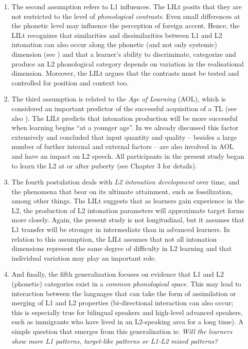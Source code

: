 \begin{enumerate}[label={(\arabic*)}]
\item
         The second assumption refers to L1 influences. The LILt posits that they are not restricted to the level of \textit{phonological contrasts}. Even small differences at the phonetic level may influence the perception of foreign accent. Hence, the LILt recognizes that similarities and dissimilarities between L1 and L2 intonation can also occur along the phonetic (and not only systemic) dimension (see ) and that a learner’s ability to discriminate, categorize and produce an L2 phonological category depends on variation in the realisational dimension. Moreover, the LILt argues that the contrasts must be tested and controlled for position and context too.\largerpage



\item
         The third assumption is related to the \textit{Age of Learning} (AOL), which is considered an important predictor of the successful acquisition of a TL (see also ). The LILt predicts that intonation production will be more successful when learning begins “at a younger age”. In  we already discussed this factor extensively and concluded that input quantity and quality -- besides a large number of further internal and external factors -- are also involved in AOL and have an impact on L2 speech. All participants in the present study began to learn the L2 at or after puberty (see Chapter 3 for details).



\item
         The fourth postulation deals with \textit{L2 intonation development} over time, and the phenomena that bear on its ultimate attainment, such as fossilization, among other things. The LILt suggests that as learners gain experience in the L2, the production of L2 intonation parameters will approximate target forms more closely. Again, the present study is not longitudinal, but it assumes that L1 transfer will be stronger in intermediate than in advanced learners. In relation to this assumption, the LILt assumes that not all intonation dimensions represent the same degree of difficulty in L2 learning and that individual variation may play an important role.



\item
         And finally, the fifth generalization focuses on evidence that L1 and L2 (phonetic) categories exist in a \textit{common phonological space}. This may lead to interaction between the languages that can take the form of assimilation or merging of L1 and L2 properties (bi-directional interaction can also occur; this is especially true for bilingual speakers and high-level advanced speakers, such as immigrants who have lived in an L2-speaking area for a long time). A simple question that emerges from this generalization is: \textit{Will the learners show more L1 patterns, target-like patterns or L1-L2 mixed patterns?}
\end{enumerate}


